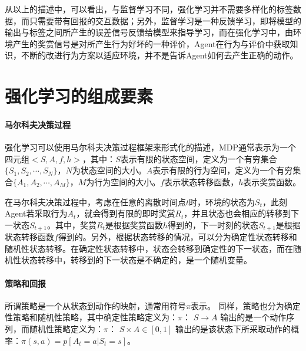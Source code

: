  从以上的描述中，可以看出，与监督学习不同，强化学习并不需要多样化的标签数据，而只需要带有回报的交互数据；另外，监督学习是一种反馈学习，即将模型的输出与标签之间所产生的误差信号反馈给模型来指导学习，而在强化学习中，由环境产生的奖赏信号是对所产生行为好坏的一种评价，Agent在行为与评价中获取知识，不断的改进行为方案以适应环境，并不是告诉Agent如何去产生正确的动作。


\section{强化学习的组成要素}
\paragraph{马尔科夫决策过程}
强化学习可以使用马尔科夫决策过程框架来形式化的描述，MDP通常表示为一个四元组$<S,A,f,h>$，其中：$S$表示有限的状态空间，定义为一个有穷集合$\{ S_1,S_2,\cdots ,S_N \}$，$N$为状态空间的大小。$A$表示有限的行为空间，定义为一个有穷集合$\{ A_1,A_2,\cdots ,A_M \}$，$M$为行为空间的大小。$f$表示状态转移函数，$h$表示奖赏函数。

在马尔科夫决策过程中，考虑在任意的离散时间点$t$时，环境的状态为$S_{t}$，此刻Agent若采取行为$A_t$，就会得到有限的即时奖赏$R_{t}$，并且状态也会相应的转移到下一状态$S_{t+1}$。其中，奖赏$R_{t}$是根据奖赏函数$h$得到的，下一时刻的状态$S_{t+1}$是根据状态转移函数$f$得到的。另外，根据状态转移的情况，可以分为确定性状态转移和随机性状态转移。在确定性状态转移中，状态会转移到确定性的下一状态，而在随机性状态转移中，转移到的下一状态是不确定的，是一个随机变量。

\paragraph{策略和回报}
所谓策略是一个从状态到动作的映射，通常用符号$\pi$表示。
同样，策略也分为确定性策略和随机性策略，其中确定性策略定义为：$\pi$： $S \to A$ 输出的是一个动作序列，而随机性策略定义为：$\pi$： $S \times A \in [0,1]$ 输出的是该状态下所采取动作的概率：$\pi(s,a)=p[A_{t}=a|S_{t}=s]$。

